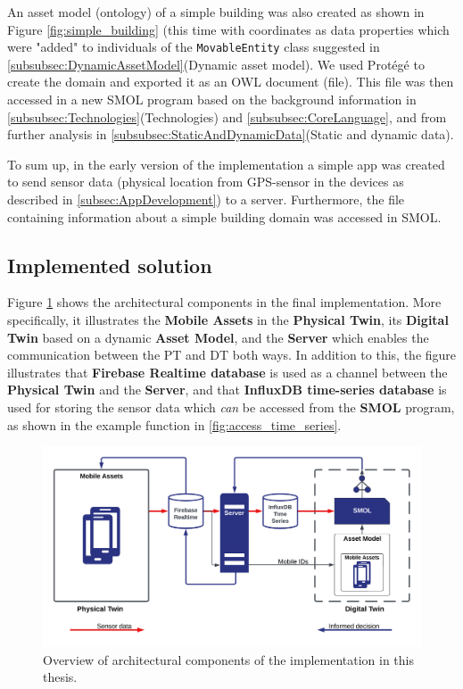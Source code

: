 \documentclass{article}
\begin{document}
An asset model (ontology) of a simple building was also created as shown in Figure \ref{fig:simple_building} (this time with coordinates as data properties which were "added" to individuals of the \verb|MovableEntity| class suggested in \ref{subsubsec:DynamicAssetModel}(Dynamic asset model). We used Protégé to create the domain and exported it as an OWL document (file). This file was then accessed in a new SMOL program based on the background information in \ref{subsubsec:Technologies}(Technologies) and \ref{subsubsec:CoreLanguage}, and from further analysis in \ref{subsubsec:StaticAndDynamicData}(Static and dynamic data). 

To sum up, in the early version of the implementation a simple app was created to send sensor data (physical location from GPS-sensor in the devices as described in \ref{subsec:AppDevelopment}) to a server. Furthermore, the file containing information about a simple building domain was accessed in SMOL.


\subsection{Implemented solution}\label{subsec:ImplementedSolution}
Figure \ref{fig:components} shows the architectural components in the final implementation. More specifically, it illustrates the \textbf{Mobile Assets} in the \textbf{Physical Twin}, its \textbf{Digital Twin} based on a dynamic \textbf{Asset Model}, and the \textbf{Server} which enables the communication between the PT and DT both ways. In addition to this, the figure illustrates that \textbf{Firebase Realtime database} is used as a channel between the \textbf{Physical Twin} and the \textbf{Server}, and that \textbf{InfluxDB time-series database} is used for storing the sensor data which \emph{can} be accessed from the \textbf{SMOL} program, as shown in the example function in \ref{fig:access_time_series}.

\begin{figure}[H]
    \centering
    \includegraphics[scale=0.12]{graphics/thesis_overview.png}
    \caption{Overview of architectural components of the implementation in this thesis.}
    \label{fig:components}
\end{figure}
\end{document}
